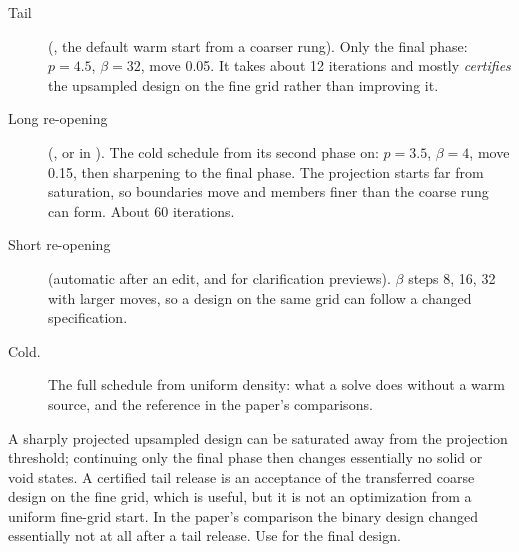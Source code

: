 \begin{description}
  \item[Tail] (, the default warm start from a coarser rung). Only the final phase: $p = 4.5$,
  $\beta = 32$, move 0.05. It takes about 12 iterations and mostly \emph{certifies} the upsampled design on the fine grid
  rather than improving it.
  \item[Long re-opening] (, or  in ). The cold schedule from its
  second phase on: $p = 3.5$, $\beta = 4$, move 0.15, then sharpening to the final phase. The projection starts far from
  saturation, so boundaries move and members finer than the coarse rung can form. About 60 iterations.
  \item[Short re-opening] (automatic after an edit, and for clarification previews). $\beta$ steps 8, 16, 32 with
  larger moves, so a design on the same grid can follow a changed specification.
  \item[Cold.] The full schedule from uniform density: what a solve does without a warm source, and the reference in
  the paper's comparisons.
\end{description}

\begin{warnbox}
A sharply projected upsampled design can be saturated away from the projection threshold; continuing only the final
phase then changes essentially no solid or void states. A certified tail release is an acceptance of the transferred
coarse design on the fine grid, which is useful, but it is not an optimization from a uniform fine-grid start. In the
paper's comparison the binary design changed essentially not at all after a tail release. Use  for the final design.
\end{warnbox}

